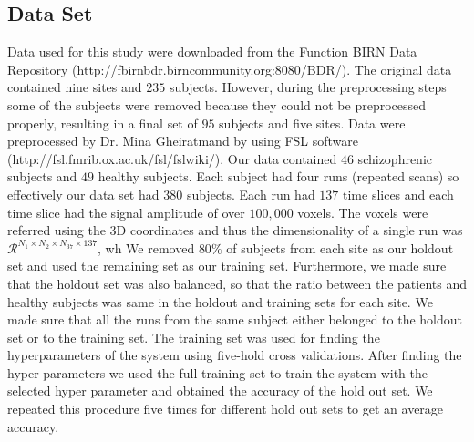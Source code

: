 \documentclass{article} %
\begin{document}
\subsection{Data Set}
Data used for this study were downloaded from the Function BIRN Data 
Repository (http://fbirnbdr.birncommunity.org:8080/BDR/). The original 
data contained nine sites and $235$ subjects. However, during the 
preprocessing steps some of the subjects were removed because they could
not be preprocessed properly, resulting in a final set of $95$ 
subjects and five sites. Data were preprocessed by Dr. Mina Gheiratmand by 
using FSL software (http://fsl.fmrib.ox.ac.uk/fsl/fslwiki/). Our data 
contained $46$ schizophrenic subjects and $49$ healthy subjects. Each subject 
had four runs (repeated scans) so effectively our data set had $380$ subjects. Each run had 
$137$ time slices and each time slice had the signal amplitude of over 
$100,000$ voxels. The voxels were referred using the 3D coordinates and thus 
the dimensionality of a single run was 
$\mathcal R^{N_1 \times N_2 \times N_37 \times 137}$, wh
We removed $80\%$ of subjects from each site as our holdout set and used the 
remaining set as our training set. Furthermore, we made sure that the holdout 
set was also balanced, so that the ratio between the patients and healthy 
subjects was same in the holdout and training sets for each site. We made 
sure that all the runs from the same subject either belonged to the holdout 
set or to the training set. The training set was used for finding the 
hyperparameters of the system using five-hold cross validations. After finding 
the hyper parameters we used the full training set to train the system with 
the selected hyper parameter and obtained the accuracy of the hold out set. 
We repeated this procedure five times for different hold out sets 
to get an average accuracy. 
\end{document}
